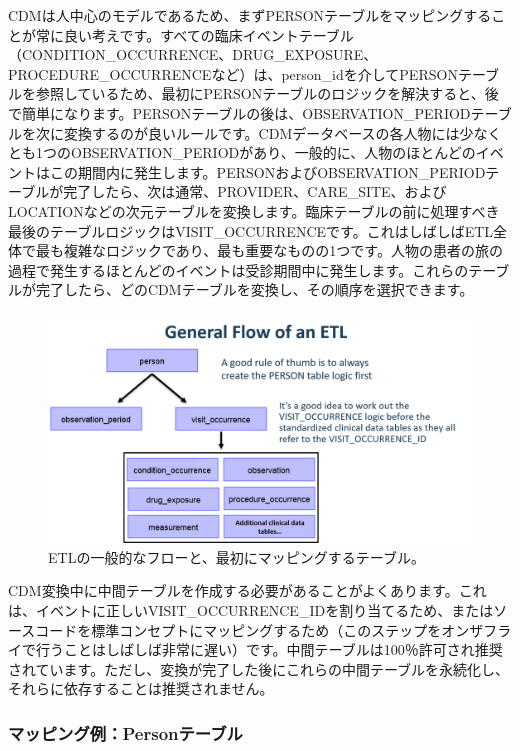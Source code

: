 \documentclass[
  11pt]{book}
\theoremstyle{definition}
\theoremstyle{definition}
\theoremstyle{definition}
\theoremstyle{definition}
\theoremstyle{remark}
\begin{document}
CDMは人中心のモデルであるため、まずPERSONテーブルをマッピングすることが常に良い考えです。すべての臨床イベントテーブル（CONDITION\_OCCURRENCE、DRUG\_EXPOSURE、PROCEDURE\_OCCURRENCEなど）は、person\_idを介してPERSONテーブルを参照しているため、最初にPERSONテーブルのロジックを解決すると、後で簡単になります。PERSONテーブルの後は、OBSERVATION\_PERIODテーブルを次に変換するのが良いルールです。CDMデータベースの各人物には少なくとも1つのOBSERVATION\_PERIODがあり、一般的に、人物のほとんどのイベントはこの期間内に発生します。PERSONおよびOBSERVATION\_PERIODテーブルが完了したら、次は通常、PROVIDER、CARE\_SITE、およびLOCATIONなどの次元テーブルを変換します。臨床テーブルの前に処理すべき最後のテーブルロジックはVISIT\_OCCURRENCEです。これはしばしばETL全体で最も複雑なロジックであり、最も重要なものの1つです。人物の患者の旅の過程で発生するほとんどのイベントは受診期間中に発生します。これらのテーブルが完了したら、どのCDMテーブルを変換し、その順序を選択できます。

\begin{figure}

{\centering \includegraphics[width=1\linewidth]{images/ExtractTransformLoad/flowOfEtl} 

}

\caption{ETLの一般的なフローと、最初にマッピングするテーブル。}\label{fig:etlFlow}
\end{figure}

CDM変換中に中間テーブルを作成する必要があることがよくあります。これは、イベントに正しいVISIT\_OCCURRENCE\_IDを割り当てるため、またはソースコードを標準コンセプトにマッピングするため（このステップをオンザフライで行うことはしばしば非常に遅い）です。中間テーブルは100％許可され推奨されています。ただし、変換が完了した後にこれらの中間テーブルを永続化し、それらに依存することは推奨されません。

\subsubsection*{マッピング例：Personテーブル}\label{ux30deux30c3ux30d4ux30f3ux30b0ux4f8bpersonux30c6ux30fcux30d6ux30eb}
\end{document}

